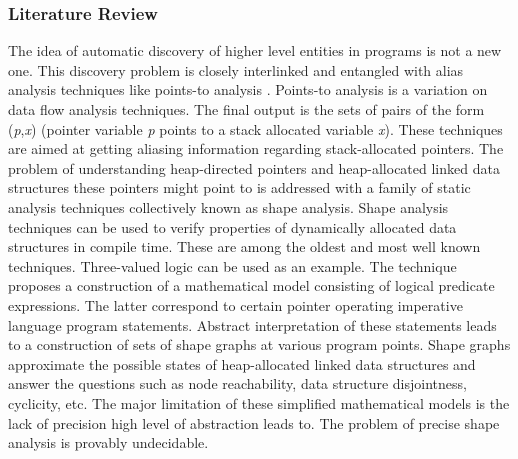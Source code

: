 \documentclass[10pt,a4paper]{report}
\begin{document}
\subsubsection{Literature Review}
\label{dcp_literature_review}
\quad The idea of automatic discovery of higher level entities in programs is not a new one. This discovery problem is closely interlinked and entangled with alias analysis techniques \cite{Muchnick:1998:ACD:286076} like points-to analysis \cite{Emami:1994:CIP:178243.178264}. Points-to analysis is a variation on data flow analysis techniques. The final output is the sets of pairs of the form (\textit{p},\textit{x}) (pointer variable \textit{p} points to a stack allocated variable \textit{x}). These techniques are aimed at getting aliasing information regarding stack-allocated pointers.\newline\null
\quad The problem of understanding heap-directed pointers and heap-allocated linked data structures these pointers might point to is addressed with a family of static analysis techniques collectively known as shape analysis. Shape analysis techniques can be used to verify properties of dynamically allocated data structures in compile time. These are among the oldest and most well known techniques. Three-valued logic \cite{Sagiv:1999:PSA:292540.292552}\cite{Wilhelm:2000:SA:647476.760384} can be used as an example. The technique proposes a construction of a mathematical model consisting of logical predicate expressions. The latter correspond to certain pointer operating imperative language program statements. Abstract interpretation of these statements leads to a construction of sets of shape graphs at various program points. Shape graphs approximate the possible states of heap-allocated linked data structures and answer the questions such as node reachability, data structure disjointness, cyclicity, etc. The major limitation of these simplified mathematical models is the lack of precision high level of abstraction leads to. The problem of precise shape analysis is provably undecidable.\newline\null
\end{document}
